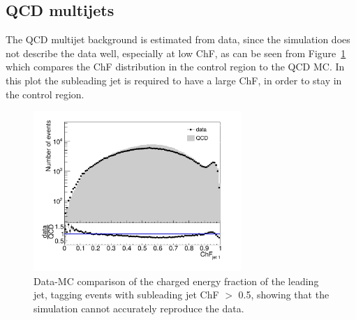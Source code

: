\subsection{QCD multijets}

The \ac{QCD} multijet background is estimated from data, since the simulation does not describe the data well, especially at low ChF, as can be seen from Figure~\ref{fig:dataMC} which compares the ChF distribution in the control region to the \ac{QCD} MC. In this plot the subleading jet is required to have a large ChF, in order to stay in the control region.

\begin{figure}[ht]
  \centering
  \includegraphics[width=0.7\textwidth]{figures/bkgd_estimation_dataMC.pdf}\hfill%
  \caption{Data-MC comparison of the charged energy fraction of the leading jet, tagging events with subleading jet ChF $>$ 0.5, showing that the simulation cannot accurately reproduce the data.}
  \label{fig:dataMC}
\end{figure}

